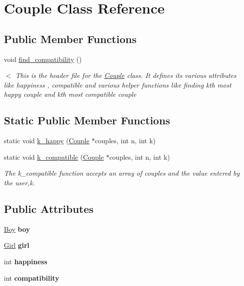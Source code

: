 \hypertarget{class_couple}{}\section{Couple Class Reference}
\label{class_couple}
\subsection*{Public Member Functions}
\begin{DoxyCompactItemize}
\item 
void \hyperlink{class_couple_afd44c116312fd411df285bde11e24b94}{find\+\_\+compatibility} ()
\begin{DoxyCompactList}\small\item\em $<$ This is the header file for the \hyperlink{class_couple}{Couple} class. It defines it\textquotesingle{}s various attributes like happiness , compatible and various helper functions like finding kth most happy couple and kth most compatible couple \end{DoxyCompactList}\end{DoxyCompactItemize}
\subsection*{Static Public Member Functions}
\begin{DoxyCompactItemize}
\item 
static void \hyperlink{class_couple_a60b6b151595d937d91d7cf9471996a9a}{k\+\_\+happy} (\hyperlink{class_couple}{Couple} $\ast$couples, int n, int k)
\item 
static void \hyperlink{class_couple_ae93d0b2f169c7e21a3822bbf60fe0f14}{k\+\_\+compatible} (\hyperlink{class_couple}{Couple} $\ast$couples, int n, int k)
\begin{DoxyCompactList}\small\item\em The k\+\_\+compatible function accepts an array of couples and the value entered by the user,k. \end{DoxyCompactList}\end{DoxyCompactItemize}
\subsection*{Public Attributes}
\begin{DoxyCompactItemize}
\item 
\mbox{\label{class_couple_a2f4c4e8df15d0a648023a29d48a4dbc8}} 
\hyperlink{class_boy}{Boy} {\bfseries boy}
\item 
\mbox{\label{class_couple_a0e654a04711c8a9e1f53472c9e57cb5a}} 
\hyperlink{class_girl}{Girl} {\bfseries girl}
\item 
\mbox{\label{class_couple_aee78d616688f0cccff84e1c23cb31f7a}} 
int {\bfseries happiness}
\item 
\mbox{\label{class_couple_af47d6ced781259303e10836182abb8c1}} 
int {\bfseries compatibility}
\end{DoxyCompactItemize}


